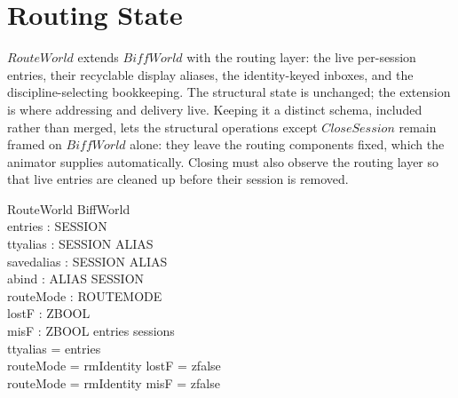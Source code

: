 \documentclass[a4paper,10pt,fleqn]{article}
\begin{document}
\section{Routing State}

$RouteWorld$ extends $BiffWorld$ with the routing layer: the live
per-session entries, their recyclable display aliases, the
identity-keyed inboxes, and the discipline-selecting bookkeeping.  The
structural state is unchanged; the extension is where addressing and
delivery live.  Keeping it a distinct schema, included rather than
merged, lets the structural operations except $CloseSession$ remain framed
on $BiffWorld$ alone: they leave the routing components fixed, which the
animator supplies automatically.  Closing must also observe the routing
layer so that live entries are cleaned up before their session is removed.

\begin{schema}{RouteWorld}
  BiffWorld \\
  entries : \power SESSION \\
  ttyalias : SESSION \pinj ALIAS \\
  savedalias : SESSION \pfun ALIAS \\
  abind : ALIAS \pfun SESSION \\
  routeMode : ROUTEMODE \\
  lostF : ZBOOL \\
  misF : ZBOOL
  \where
  entries \subseteq sessions \\
  \dom ttyalias = entries \\
  routeMode = rmIdentity \implies lostF = zfalse \\
  routeMode = rmIdentity \implies misF = zfalse
\end{schema}
\end{document}
